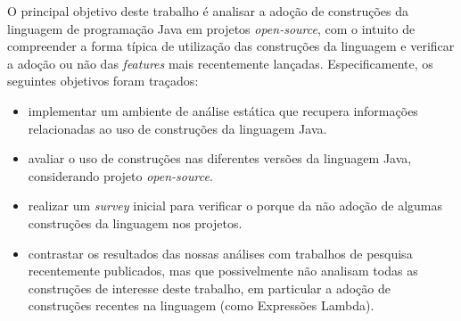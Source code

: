 	O principal objetivo deste trabalho é analisar a adoção de construções da linguagem de programação 
	Java em projetos \textit{open-source}, com o intuito de compreender a forma típica de utilização das construções 
	da linguagem e verificar a adoção ou não das \textit{features} mais recentemente lançadas. Especificamente, 
	os seguintes objetivos foram traçados:
	
	\begin{itemize}
	  \item implementar um ambiente de análise estática que recupera informações relacionadas ao uso 
	    de construções da linguagem Java. 
	  
	  \item avaliar o uso de construções nas diferentes versões da linguagem Java, considerando 
	  projeto \textit{open-source}. 
	  
	  \item realizar um \textit{survey} inicial para verificar o porque da não adoção de algumas construções 
	  da linguagem nos projetos. 
	  
	  \item contrastar os resultados das nossas análises com trabalhos de pesquisa recentemente publicados, 
	  mas que possivelmente não analisam todas as construções de interesse deste trabalho, em particular 
	  a adoção de construções recentes na linguagem (como Expressões Lambda). 
	\end{itemize}
	
%	

